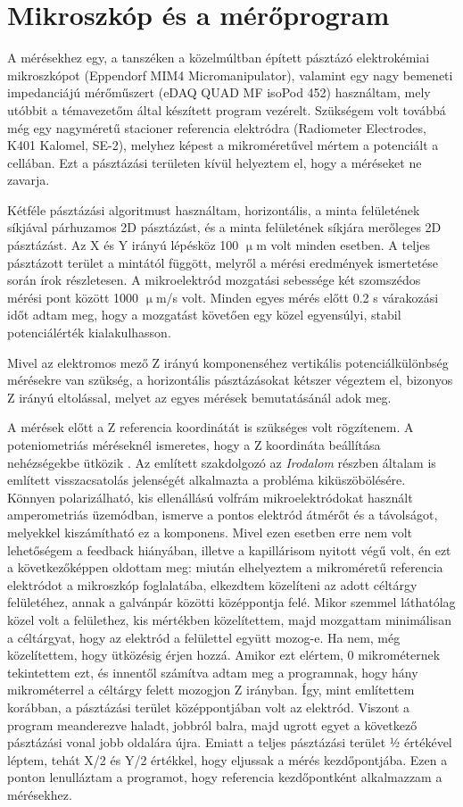 \section{Mikroszkóp és a mérőprogram}

A mérésekhez egy, a tanszéken a közelmúltban épített pásztázó elektrokémiai mikroszkópot (Eppendorf MIM4 Micromanipulator), valamint egy nagy bemeneti impedanciájú mérőműszert (eDAQ QUAD MF isoPod 452) használtam, mely utóbbit a témavezetőm által készített program vezérelt. Szükségem volt továbbá még egy nagyméretű stacioner referencia elektródra (Radiometer Electrodes, K401 Kalomel, SE-2), melyhez képest a mikroméretűvel mértem a potenciált a cellában. Ezt a pásztázási területen kívül helyeztem el, hogy a méréseket ne zavarja. 

Kétféle pásztázási algoritmust használtam, horizontális, a minta felületének síkjával párhuzamos 2D pásztázást, és a minta felületének síkjára merőleges 2D pásztázást. Az X és Y irányú lépésköz 100 $\upmu$m volt minden esetben. A teljes pásztázott terület a mintától függött, melyről a mérési eredmények ismertetése során írok részletesen. A mikroelektród mozgatási sebessége két szomszédos mérési pont között 1000 $\upmu$m/s volt. Minden egyes mérés előtt 0.2 s várakozási időt adtam meg, hogy a mozgatást követően egy közel egyensúlyi, stabil potenciálérték kialakulhasson.  

Mivel az elektromos mező Z irányú komponenséhez vertikális potenciálkülönbség mérésekre van szükség, a horizontális pásztázásokat kétszer végeztem el, bizonyos Z irányú eltolással, melyet az egyes mérések bemutatásánál adok meg.

A mérések előtt a Z referencia koordinátát is szükséges volt rögzítenem. A poteniometriás méréseknél ismeretes, hogy a Z koordináta beállítása nehézségekbe ütközik \cite{Klucsik János Msc Szakdolgozata}. Az említett szakdolgozó az \emph{Irodalom} részben általam is említett visszacsatolás jelenségét alkalmazta a probléma kiküszöbölésére. Könnyen polarizálható, kis ellenállású volfrám mikroelektródokat használt amperometriás üzemódban, ismerve a pontos elektród átmérőt és a távolságot, melyekkel kiszámítható ez a komponens. Mivel ezen esetben erre nem volt lehetőségem a feedback hiányában, illetve a kapillárisom nyitott végű volt, én ezt a következőképpen oldottam meg: miután elhelyeztem a mikroméretű referencia elektródot a mikroszkóp foglalatába, elkezdtem közelíteni az adott céltárgy felületéhez, annak a galvánpár közötti középpontja felé. Mikor szemmel láthatólag közel volt a felülethez, kis mértékben közelítettem, majd mozgattam minimálisan a céltárgyat, hogy az elektród a felülettel együtt mozog-e. Ha nem, még közelítettem, hogy ütközésig érjen hozzá. Amikor ezt elértem, 0 mikrométernek tekintettem ezt, és innentől számítva adtam meg a programnak, hogy hány mikrométerrel a céltárgy felett mozogjon Z irányban. Így, mint említettem korábban, a pásztázási terület középpontjában volt az elektród. Viszont a program meanderezve haladt, jobbról balra, majd ugrott egyet a következő pásztázási vonal jobb oldalára újra.  Emiatt a teljes pásztázási terület ½ értékével léptem, tehát X/2 és Y/2 értékkel, hogy eljussak a mérés kezdőpontjába. Ezen a ponton lenulláztam a programot, hogy referencia kezdőpontként alkalmazzam a mérésekhez.

